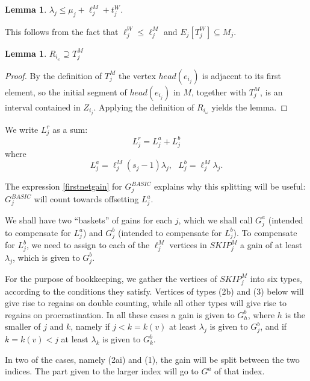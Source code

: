 \documentclass{amsart}
\newtheorem{lemma}[theorem]{Lemma}
\theoremstyle{remark}
\newcommand{\eij}{e_{i_j}}
\newcommand{\ljm}{{\ell}_{j}^M}
\newcommand{\ljw}{{\ell}_{j}^W}
\newcommand{\Tjm}{T^M_j}
\newcommand{\tjw}{t^W_j}
\newcommand{\Tjw}{T^W_j}
\newcommand{\skipmj}{{SKIP}^M_j}
\begin{document}
\begin{lemma}\label{lambdalessthanmu}
 $\lambda_j \le \mu_j+\ljm +\tjw$.
\end{lemma}

This follows from the fact that $\ljw \le \ljm$ and
$E_j[\Tjw]\subseteq M_j$.



\begin{lemma}\label{romega}
$R_{i_\omega} \supseteq \Tjm$
\end{lemma}

\begin{proof} By the definition of $\Tjm$ the vertex $head(\eij)$ is adjacent to its first element, so the initial segment of $head(\eij)$ in $M$, together with $\Tjm$, is an  interval contained in $Z_{i_j}$.
Applying the definition of
 $R_{i_\omega}$ yields the lemma. \end{proof}


We write $ L^r_j$ as a sum: $$L^r_j=L^a_j + L^b_j$$
where
 \begin{equation} \label{splitlr}
 L^a_j=\ljm (s_j-1)\lambda_j,~~~L^b_j=\ljm\lambda_j.
 \end{equation}


The expression \eqref{firstnetgain} for $G^{BASIC}_j$ explains why  this splitting will be useful: $G^{BASIC}_j$ will count towards offsetting $L^a_j$.





We shall have two ``baskets'' of gains for each $j$, which we shall call $G_j^a$ (intended to compensate for $L_j^a$) and $G_j^b$ (intended to compensate for $L_j^b$).
To compensate for $L^b_j$, we need to assign to
each of the $\ljm$ vertices  in $\skipmj$  a gain of at least $\lambda_j$, which is given to $G^b_j$.

For the purpose of bookkeeping, we gather the vertices of $\skipmj$
into six types, according to the conditions they satisfy. Vertices
of types (2b) and (3) below will give rise to regains on double
counting, while all other types will give rise to regains on
procrastination. In all these cases a gain is given to $G^b_h$,
where $h$ is the smaller of $j$ and $k$, namely if $j<k=k(v)$ at
least $\lambda_j$ is given to $G^b_j$, and if $k=k(v)<j$ at least
$\lambda_k$ is given to $G^b_k$.


In two of the cases, namely (2ai) and (1),  the gain will be split
between the two indices. The part
given to the larger index will go to $G^a$ of that index.
\end{document}
